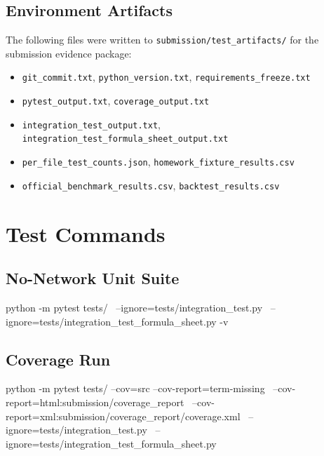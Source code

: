 \documentclass[11pt]{article}
\newcommand{\code}[1]{\texttt{#1}}
\begin{document}
\subsection{Environment Artifacts}

The following files were written to \code{submission/test\_artifacts/}
for the submission evidence package:

\begin{itemize}
  \item \code{git\_commit.txt}, \code{python\_version.txt}, \code{requirements\_freeze.txt}
  \item \code{pytest\_output.txt}, \code{coverage\_output.txt}
  \item \code{integration\_test\_output.txt}, \code{integration\_test\_\allowbreak formula\_sheet\_output.txt}
  \item \code{per\_file\_\allowbreak test\_counts.json},
    \code{homework\_fixture\_\allowbreak results.csv}
  \item \code{official\_benchmark\_\allowbreak results.csv},
    \code{backtest\_results.csv}
\end{itemize}

\section{Test Commands}

\subsection{No-Network Unit Suite}

\begin{shellcode}
python -m pytest tests/ \
  --ignore=tests/integration_test.py \
  --ignore=tests/integration_test_formula_sheet.py -v
\end{shellcode}

\subsection{Coverage Run}

\begin{shellcode}
python -m pytest tests/ --cov=src --cov-report=term-missing \
  --cov-report=html:submission/coverage_report \
  --cov-report=xml:submission/coverage_report/coverage.xml \
  --ignore=tests/integration_test.py \
  --ignore=tests/integration_test_formula_sheet.py
\end{shellcode}
\end{document}
